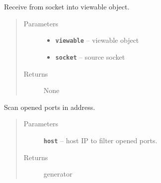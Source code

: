 \documentclass[letterpaper,10pt,english]{sphinxmanual}
\begin{document}

\begin{fulllineitems}
\label{RRtoolbox.lib:RRtoolbox.lib.serverServices.recv_into}
Receive from socket into viewable object.
\begin{quote}\begin{description}
\item[{Parameters}] \leavevmode\begin{itemize}
\item {} 
\textbf{\texttt{viewable}} -- viewable object

\item {} 
\textbf{\texttt{socket}} -- source socket

\end{itemize}

\item[{Returns}] \leavevmode
None

\end{description}\end{quote}

\end{fulllineitems}


\begin{fulllineitems}
\label{RRtoolbox.lib:RRtoolbox.lib.serverServices.scan_ports}
Scan opened ports in address.
\begin{quote}\begin{description}
\item[{Parameters}] \leavevmode
\textbf{\texttt{host}} -- host IP to filter opened ports.

\item[{Returns}] \leavevmode
generator

\end{description}\end{quote}

\end{fulllineitems}

\end{document}

